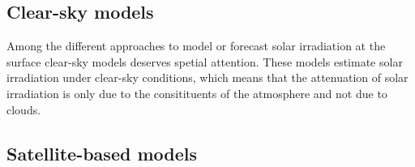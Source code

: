 
\subsection{Clear-sky models}

Among the different approaches to model or forecast solar irradiation at the surface clear-sky models deserves spetial attention. These models estimate solar irradiation under clear-sky conditions, which means that the attenuation of solar irradiation is only due to the consitituents of the atmosphere and not due to clouds.
\subsection{Satellite-based models}



